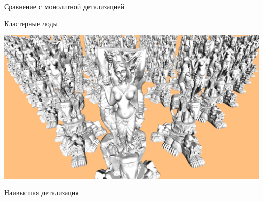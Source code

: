 \begin{frame}{Сравнение с монолитной детализацией}
\begin{center}
\begin{minipage}{.45\textwidth}
\begin{center}
                Кластерные лоды
            \end{center}
        \end{minipage}
        \begin{minipage}{.45\textwidth}
            \begin{center}
                \includegraphics[width=\textwidth]{../Text/pics/comparison-0.png}

                Наивысшая детализация
            \end{center}
        \end{minipage}
    \end{center}
\end{frame}
